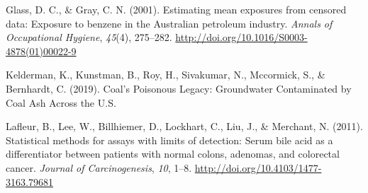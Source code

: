 \documentclass[12pt, twoside]{amherstthesis}
\newlength{\cslhangindent}
\newenvironment{cslreferences}%
  {\setlength{\parindent}{0pt}%
  \everypar{\setlength{\hangindent}{\cslhangindent}}\ignorespaces}%
  {\par}
\begin{document}
\begin{cslreferences}
\leavevmode\hypertarget{ref-Glass2001}{}%
Glass, D. C., \& Gray, C. N. (2001). Estimating mean exposures from censored data: Exposure to benzene in the Australian petroleum industry. \emph{Annals of Occupational Hygiene}, \emph{45}(4), 275--282. \url{http://doi.org/10.1016/S0003-4878(01)00022-9}

\leavevmode\hypertarget{ref-Kelderman2019}{}%
Kelderman, K., Kunstman, B., Roy, H., Sivakumar, N., Mccormick, S., \& Bernhardt, C. (2019). Coal's Poisonous Legacy: Groundwater Contaminated by Coal Ash Across the U.S.

\leavevmode\hypertarget{ref-Lafleur2011}{}%
Lafleur, B., Lee, W., Billhiemer, D., Lockhart, C., Liu, J., \& Merchant, N. (2011). Statistical methods for assays with limits of detection: Serum bile acid as a differentiator between patients with normal colons, adenomas, and colorectal cancer. \emph{Journal of Carcinogenesis}, \emph{10}, 1--8. \url{http://doi.org/10.4103/1477-3163.79681}
\end{cslreferences}
\end{document}
